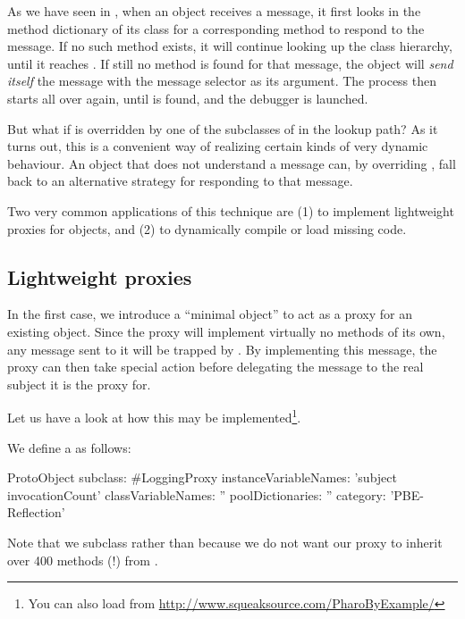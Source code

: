\documentclass[a4paper,10pt,twoside]{book}
\begin{document}
As we have seen in , when an object receives a message, it first looks in the method dictionary of its class for a corresponding method to respond to the message.
If no such method exists, it will continue looking up the class hierarchy, until it reaches . If still no method is found for that message, the object will \emph{send itself} the message  with the message selector as its argument.
The process then starts all over again, until  is found, and the debugger is launched.

But what if  is overridden by one of the subclasses of  in the lookup path?
As it turns out, this is a convenient way of realizing certain kinds of very dynamic behaviour. An object that does not understand a message can, by overriding , fall back to an alternative strategy for responding to that message.

Two very common applications of this technique are (1) to implement lightweight proxies for objects, and (2) to dynamically compile or load missing code.

\subsection{Lightweight proxies}

In the first case, we introduce a ``minimal object'' to act as a proxy for an existing object.
Since the proxy will implement virtually no methods of its own, any message sent to it will be trapped by . By implementing this message, the proxy can then take special action before delegating the message to the real subject it is the proxy for.

Let us have a look at how this may be implemented\footnote{You can also load  from \url{http://www.squeaksource.com/PharoByExample/}}.

We define a  as follows:
\begin{code}{}
ProtoObject subclass: #LoggingProxy
	instanceVariableNames: 'subject invocationCount'
	classVariableNames: ''
	poolDictionaries: ''
	category: 'PBE-Reflection'
\end{code}
Note that we subclass  rather than  because we do not want our proxy to inherit over 400 methods (!) from .
\end{document}
